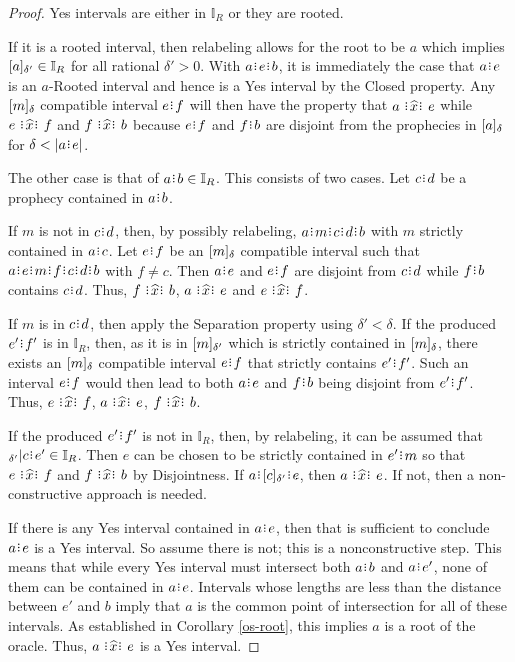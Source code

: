 \documentclass[12pt]{article}
\begin{document}
\begin{proof}
    Yes intervals are either in $\mathbb{I}_R$ or they are rooted. 
    
    If it is a rooted interval, then relabeling allows for the root to be $a$ which implies $\halo[\delta']{a} \in \mathbb{I}_R$ for all rational $\delta' >0$. With $a\rint e\rint b$, it is immediately the case that $a\rint e$ is an $a$-Rooted interval and hence is a Yes interval by the Closed property. Any $\halo{m}$ compatible interval $e\rint f$ will then have the property that $a \xora e$ while \sout{$e\xora f$} and \sout{$f\xora b$} because $e\rint f$ and $f\rint b$ are disjoint from the prophecies in $\halo{a}$ for $\delta < |a\rint e|$.
 
    The other case is that of $a\rint b \in \mathbb{I}_R$. This consists of two cases. Let $c\rint d$ be a prophecy contained in $a\rint b$. 
    
    If $m$ is not in $c\rint d$, then, by possibly relabeling, $a\rint m\rint c\rint d\rint b$ with $m$ strictly contained in $a\rint c$.  Let $e\rint f$ be an $\halo{m}$ compatible interval such that $a\rint e\rint m\rint f\rint c\rint d\rint b$ with $f \neq c$. Then $a\rint e$ and $e\rint f$ are disjoint from $c\rint d$ while $f\rint b$ contains $c\rint d$. Thus, $f \xora b$, \sout{$a\xora e$} and \sout{$e\xora f$}.

    If $m$ is in $c\rint d$, then apply the Separation property using  $\delta' < \delta$. If the produced $e'\rint f'$ is in $\mathbb{I}_R$, then, as it is in $\halo[\delta']{m}$ which is strictly contained in $\halo{m}$, there exists an $\halo{m}$ compatible interval $e\rint f$ that strictly contains $e'\rint f'$. Such an interval $e\rint f$ would then lead to both $a\rint e$ and $f\rint b$ being disjoint from $e'\rint f'$. Thus, $e \xora f$, \sout{$a\xora e$}, \sout{$f\xora b$}.

    If the produced $e'\rint f'$ is not in $\mathbb{I}_R$, then, by relabeling, it can be assumed that ${}_{\delta'} |c\rint e' \in \mathbb{I}_R$. Then $e$ can be chosen to be strictly contained in $e'\rint m$ so that \sout{$e\xora f$} and \sout{$f\xora b$} by Disjointness. If $a\rint \halo[\delta']{c}\rint e$, then $a \xora e$. If not, then a non-constructive approach is needed.

    If there is any Yes interval contained in $a\rint e$, then that is sufficient to conclude $a\rint e$ is a Yes interval. So assume there is not; this is a nonconstructive step. This means that while every Yes interval must intersect both $a\rint b$ and $a\rint e'$, none of them can be contained in $a\rint e$. Intervals whose lengths are less than the distance between $e'$ and $b$ imply that $a$ is the common point of intersection for all of these intervals. As established in Corollary \ref{os-root}, this implies $a$ is a root of the oracle. Thus, $a \xora e$ is a Yes interval. 

\end{proof}
\end{document}
